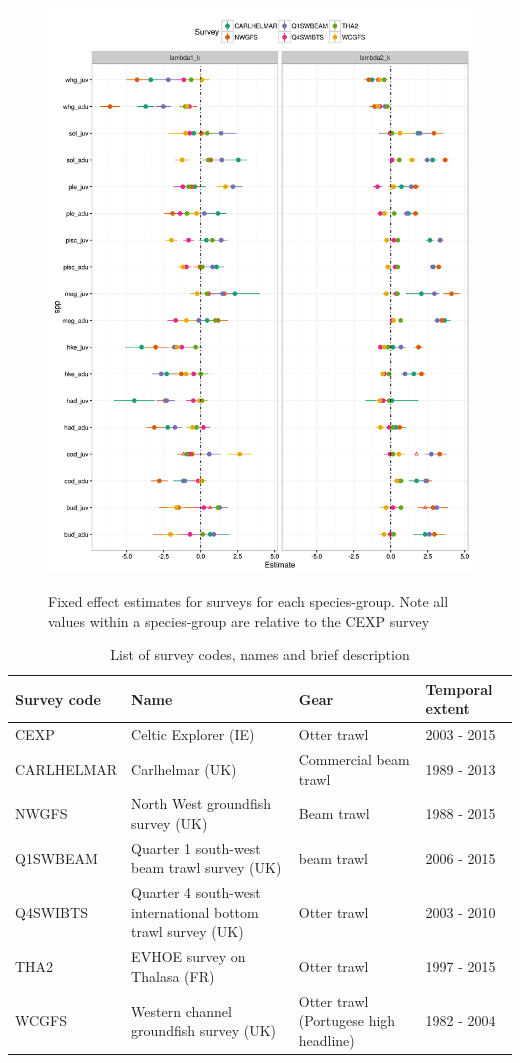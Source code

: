 \documentclass{article}
\begin{document}
\begin{figure}[!ht]
\begin{center}
	\includegraphics[width = 0.9\linewidth]{"figures/Suppl - QEstimatesALL"}
	\label{fig:S11}
	\caption{Fixed effect estimates for surveys for each species-group. Note
	all values within a species-group are relative to the CEXP survey}
	\end{center}
\end{figure}



\begin{table}[!ht]
	\caption{List of survey codes, names and brief description}
	\center
	\begin{tabular}{ p{3cm} p{4cm} p{4cm} p{3cm} }
		\hline
		Survey code    & Name 	& Gear & Temporal extent \\
		\hline
		CEXP           & Celtic Explorer (IE)   & Otter trawl & 2003 - 2015 \\
		CARLHELMAR     & Carlhelmar (UK)	& Commercial beam trawl & 1989 - 2013 \\
		NWGFS          & North West groundfish survey (UK) & Beam trawl & 1988 - 2015 \\
		Q1SWBEAM       & Quarter 1 south-west beam trawl survey (UK) 	& beam trawl & 2006 - 2015 \\
		Q4SWIBTS       & Quarter 4 south-west international bottom trawl survey (UK) & Otter trawl & 2003 - 2010 \\
		THA2           & EVHOE survey on Thalasa (FR) & Otter trawl & 1997 - 2015 \\
		WCGFS          & Western channel groundfish survey (UK) & Otter
		trawl (Portugese high headline) & 1982 - 2004 \\
		\hline
	\end{tabular}
\end{table}
\end{document}
